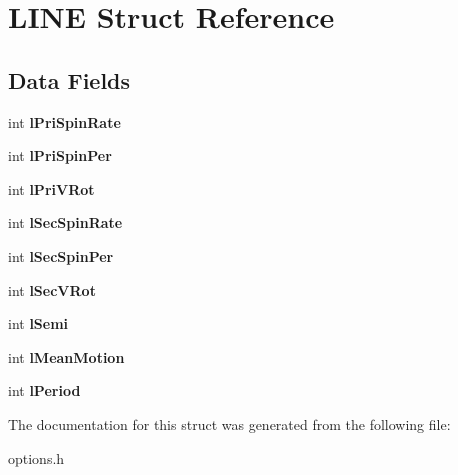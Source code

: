 \hypertarget{struct_l_i_n_e}{}\section{L\+I\+N\+E Struct Reference}
\label{struct_l_i_n_e}
\subsection*{Data Fields}
\begin{DoxyCompactItemize}
\item 
\hypertarget{struct_l_i_n_e_a4784d4917174296d829b214a0c4fa2ca}{}int {\bfseries l\+Pri\+Spin\+Rate}\label{struct_l_i_n_e_a4784d4917174296d829b214a0c4fa2ca}

\item 
\hypertarget{struct_l_i_n_e_a76a0670aeb50dfa854d6d3e4450c9473}{}int {\bfseries l\+Pri\+Spin\+Per}\label{struct_l_i_n_e_a76a0670aeb50dfa854d6d3e4450c9473}

\item 
\hypertarget{struct_l_i_n_e_a3a6281320f43ab1444debc589044b920}{}int {\bfseries l\+Pri\+V\+Rot}\label{struct_l_i_n_e_a3a6281320f43ab1444debc589044b920}

\item 
\hypertarget{struct_l_i_n_e_a7b542b532b74050bc51bb7ceb6b2abdc}{}int {\bfseries l\+Sec\+Spin\+Rate}\label{struct_l_i_n_e_a7b542b532b74050bc51bb7ceb6b2abdc}

\item 
\hypertarget{struct_l_i_n_e_a217b677308a2bc42856d36b8747899ad}{}int {\bfseries l\+Sec\+Spin\+Per}\label{struct_l_i_n_e_a217b677308a2bc42856d36b8747899ad}

\item 
\hypertarget{struct_l_i_n_e_a3ff314af81dd0b0ded88373758af04c3}{}int {\bfseries l\+Sec\+V\+Rot}\label{struct_l_i_n_e_a3ff314af81dd0b0ded88373758af04c3}

\item 
\hypertarget{struct_l_i_n_e_a9573c233a929365b55c7467a5dd648e5}{}int {\bfseries l\+Semi}\label{struct_l_i_n_e_a9573c233a929365b55c7467a5dd648e5}

\item 
\hypertarget{struct_l_i_n_e_af03a976df891a90efeddb5bfe125aff9}{}int {\bfseries l\+Mean\+Motion}\label{struct_l_i_n_e_af03a976df891a90efeddb5bfe125aff9}

\item 
\hypertarget{struct_l_i_n_e_a694421c5ac172a8dc6826c38dd98a699}{}int {\bfseries l\+Period}\label{struct_l_i_n_e_a694421c5ac172a8dc6826c38dd98a699}

\end{DoxyCompactItemize}


The documentation for this struct was generated from the following file\+:\begin{DoxyCompactItemize}
\item 
options.\+h\end{DoxyCompactItemize}
